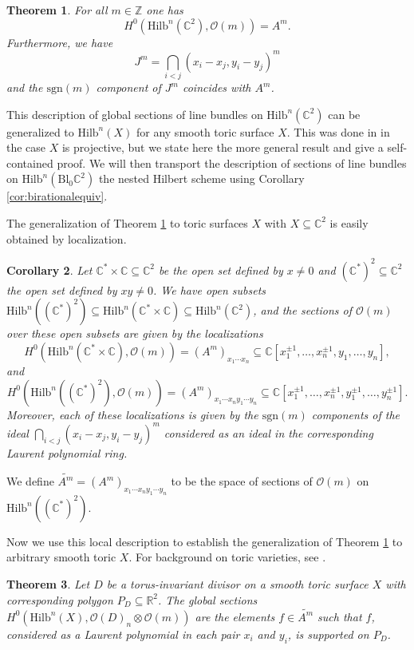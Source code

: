 \documentclass[12pt]{amsart}
\newcommand{\Hilb}{\mathrm{Hilb}}
\newcommand{\C}{\mathbb{C}}
\newcommand{\Z}{\mathbb{Z}}
\newcommand{\R}{\mathbb{R}}
\newcommand{\CO}{\mathcal{O}}
\newcommand{\sgn}{\mathrm{sgn}}
\newcommand{\Bl}{\mathrm{Bl}}
\numberwithin{equation}{section}
\newtheorem{theorem}{Theorem}[section]
\newtheorem{corollary}[theorem]{Corollary}
\theoremstyle{definition}
\begin{document}
\begin{theorem}\cite{Haiman,Haimanqt}\label{thm:secC2HS}
For all $m\in \Z$ one has
$$
H^0(\Hilb^n(\C^2),\CO(m))=A^m.
$$
Furthermore, we have  
$$
J^m=\bigcap_{i<j}(x_i-x_j,y_i-y_j)^m
$$
and the $\sgn(m)$ component of $J^m$ coincides with $A^m$. %
\end{theorem}

This description of global sections of line bundles on $\Hilb^n(\C^2)$ can be generalized to $\Hilb^n(X)$ for any smooth toric surface $X$. This was done in \cite{C} in the case $X$ is projective, but we state here the more general result and give a self-contained proof. We will then transport the description of sections of line bundles on $\Hilb^n(\Bl_0\C^2)$ the nested Hilbert scheme using Corollary \ref{cor:birationalequiv}. 

The generalization of Theorem \ref{thm:secC2HS} to toric surfaces $X$ with $X\subseteq \C^2$ is easily obtained by localization.

\begin{corollary}\label{cor:SectionsOverOpens}
    Let $\C^*\times \C\subseteq \C^2$ be the open set defined by $x\neq 0$ and $(\C^*)^2\subseteq \C^2$ the open set defined by $xy\neq 0$. We have open subsets $\Hilb^n((\C^*)^2)\subseteq \Hilb^n(\C^*\times \C)\subseteq \Hilb^n(\C^2)$, and the sections of $\mathcal{O}(m)$ over these open subsets are given by the localizations
    \[ H^0(\Hilb^n(\C^*\times \C),\mathcal{O}(m)) = (A^m)_{x_1\cdots x_n}\subseteq \C[x_1^{\pm1},\dots,x_n^{\pm1},y_1,\dots,y_n],\]
    and 
    \[ H^0(\Hilb^n((\C^*)^2),\mathcal{O}(m)) = (A^m)_{x_1\cdots x_n y_1\cdots y_n}\subseteq \C[x_1^{\pm1},\dots,x_n^{\pm1},y_1^{\pm1},\dots,y_n^{\pm1}].\]
    Moreover, each of these localizations is given by the $\sgn(m)$ components of the ideal $\bigcap_{i<j}(x_i-x_j,y_i-y_j)^m$ considered as an ideal in the corresponding Laurent polynomial ring.
\end{corollary}


We define $\widetilde{A^m}=(A^m)_{x_1\cdots x_n y_1\cdots y_n}$ to be the space of sections of $\mathcal{O}(m)$ on $\Hilb^n((\C^*)^2).$

Now we use this local description to establish the generalization of Theorem \ref{thm:secC2HS} to arbitrary smooth toric $X$. For background on toric varieties, see \cite{Fulton}.

\begin{theorem}
    Let $D$ be a torus-invariant divisor on a smooth toric surface $X$ with corresponding polygon $P_D\subseteq \R^2$. The global sections $H^0(\Hilb^n(X),\mathcal{O}(D)_n\otimes \mathcal{O}(m))$ are the elements $f\in\widetilde{A^m}$ such that $f$, considered as a Laurent polynomial in each pair $x_i$ and $y_i$, is supported on $P_D$.
\end{theorem}
\end{document}
